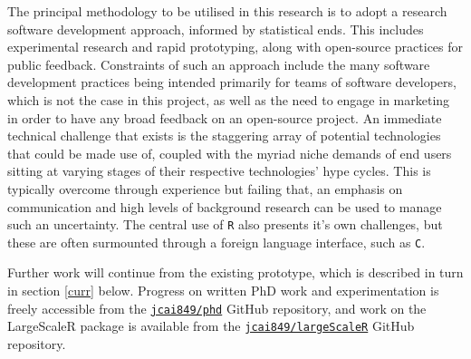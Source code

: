 The principal methodology to be utilised in this research is to adopt a research software development approach, informed by statistical ends\cite{bezroukov1999open}.
This includes experimental research and rapid prototyping, along with open-source practices for public feedback.
Constraints of such an approach include the many software development practices being intended primarily for teams of software developers, which is not the case in this project, as well as the need to engage in marketing in order to have any broad feedback on an open-source project.
An immediate technical challenge that exists is the staggering array of potential technologies that could be made use of, coupled with the myriad niche demands of end users sitting at varying stages of their respective technologies' hype cycles.
This is typically overcome through experience but failing that, an emphasis on communication and high levels of background research can be used to manage such an uncertainty.
The central use of \texttt{R} also presents it's own challenges, but these are often surmounted through a foreign language interface, such as \texttt{C}\cite{wickham2019advancedr}.

Further work will continue from the existing prototype, which is described in turn in section \ref{curr} below.
Progress on written PhD work and experimentation is freely accessible from the \href{https://github.com/jcai849/phd}{\texttt{jcai849/phd}} GitHub repository, and work on the LargeScaleR package is available from the \href{https://github.com/jcai849/phd}{\texttt{jcai849/largeScaleR}} GitHub repository\cite{cairns2020largescaler}.
